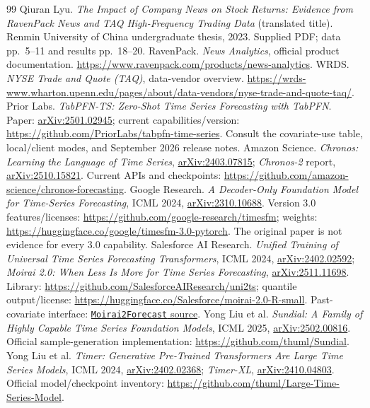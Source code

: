 \documentclass[11pt,letterpaper]{article}
\begin{document}
\begin{thebibliography}{99}
\small
{} Qiuran Lyu. \emph{The Impact of Company News on Stock Returns: Evidence from RavenPack News and TAQ High-Frequency Trading Data} (translated title). Renmin University of China undergraduate thesis, 2023. Supplied PDF; data pp.~5--11 and results pp.~18--20.
 RavenPack. \emph{News Analytics}, official product documentation. \url{https://www.ravenpack.com/products/news-analytics}.
 WRDS. \emph{NYSE Trade and Quote (TAQ)}, data-vendor overview. \url{https://wrds-www.wharton.upenn.edu/pages/about/data-vendors/nyse-trade-and-quote-taq/}.
 Prior Labs. \emph{TabPFN-TS: Zero-Shot Time Series Forecasting with TabPFN}. Paper: \href{https://arxiv.org/abs/2501.02945}{arXiv:2501.02945}; current capabilities/version: \url{https://github.com/PriorLabs/tabpfn-time-series}. Consult the covariate-use table, local/client modes, and September 2026 release notes.
 Amazon Science. \emph{Chronos: Learning the Language of Time Series}, \href{https://arxiv.org/abs/2403.07815}{arXiv:2403.07815}; \emph{Chronos-2} report, \href{https://arxiv.org/abs/2510.15821}{arXiv:2510.15821}. Current APIs and checkpoints: \url{https://github.com/amazon-science/chronos-forecasting}.
 Google Research. \emph{A Decoder-Only Foundation Model for Time-Series Forecasting}, ICML 2024, \href{https://arxiv.org/abs/2310.10688}{arXiv:2310.10688}. Version 3.0 features/licenses: \url{https://github.com/google-research/timesfm}; weights: \url{https://huggingface.co/google/timesfm-3.0-pytorch}. The original paper is not evidence for every 3.0 capability.
 Salesforce AI Research. \emph{Unified Training of Universal Time Series Forecasting Transformers}, ICML 2024, \href{https://arxiv.org/abs/2402.02592}{arXiv:2402.02592}; \emph{Moirai 2.0: When Less Is More for Time Series Forecasting}, \href{https://arxiv.org/abs/2511.11698}{arXiv:2511.11698}. Library: \url{https://github.com/SalesforceAIResearch/uni2ts}; quantile output/license: \url{https://huggingface.co/Salesforce/moirai-2.0-R-small}. Past-covariate interface: \href{https://github.com/SalesforceAIResearch/uni2ts/blob/main/src/uni2ts/model/moirai2/forecast.py}{\texttt{Moirai2Forecast} source}.
 Yong Liu et al. \emph{Sundial: A Family of Highly Capable Time Series Foundation Models}, ICML 2025, \href{https://arxiv.org/abs/2502.00816}{arXiv:2502.00816}. Official sample-generation implementation: \url{https://github.com/thuml/Sundial}.
 Yong Liu et al. \emph{Timer: Generative Pre-Trained Transformers Are Large Time Series Models}, ICML 2024, \href{https://arxiv.org/abs/2402.02368}{arXiv:2402.02368}; \emph{Timer-XL}, \href{https://arxiv.org/abs/2410.04803}{arXiv:2410.04803}. Official model/checkpoint inventory: \url{https://github.com/thuml/Large-Time-Series-Model}.

\end{thebibliography}
\end{document}
